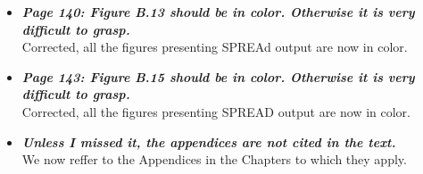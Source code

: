 \documentclass[english]{article}
\begin{document}
\begin{itemize}
\item {
{\it
\textbf{
Page 140: Figure B.13 should be in color. 
Otherwise it is very difficult to grasp.
}%
}%
}%
\\
Corrected, all the figures presenting SPREAd output are now in color.


\item {
{\it
\textbf{
Page 143: Figure B.15 should be in color. 
Otherwise it is very difficult to grasp.
}%
}%
}%
\\
Corrected, all the figures presenting SPREAD output are now in color.




\item {
{\it
\textbf{
Unless I missed it, the appendices are not cited in the text.
}%
}%
}%
\\
We now reffer to the Appendices in the Chapters to which they apply.


\end{itemize}












\end{document}
